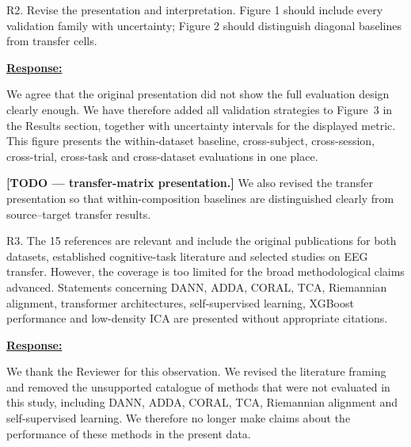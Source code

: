 \documentclass{article}
\begin{document}
\vspace{0.3cm}


\begin{cmt}{}{}

R2. Revise the presentation and interpretation. Figure 1 should include every
validation family with uncertainty; Figure 2 should distinguish diagonal
baselines from transfer cells.

\end{cmt}
\vspace{0.1cm}
\noindent
\underline{\textbf{Response:}}
\vspace{0.2cm}

We agree that the original presentation did not show the full evaluation
design clearly enough. We have therefore added all validation strategies to
Figure~3 in the Results section, together with uncertainty intervals for the
displayed metric. This figure presents the within-dataset baseline,
cross-subject, cross-session, cross-trial, cross-task and cross-dataset
evaluations in one place.

\textbf{[TODO --- transfer-matrix presentation.]}
We also revised the transfer presentation so that within-composition baselines
are distinguished clearly from source--target transfer results.

\vspace{0.3cm}


\begin{cmt}{}{}

R3. The 15 references are relevant and include the original publications for
both datasets, established cognitive-task literature and selected studies on EEG
transfer. However, the coverage is too limited for the broad methodological
claims advanced. Statements concerning DANN, ADDA, CORAL, TCA, Riemannian
alignment, transformer architectures, self-supervised learning, XGBoost
performance and low-density ICA are presented without appropriate citations.

\end{cmt}
\vspace{0.1cm}
\noindent
\underline{\textbf{Response:}}
\vspace{0.2cm}

We thank the Reviewer for this observation. We revised the literature framing
and removed the unsupported catalogue of methods that were not evaluated in
this study, including DANN, ADDA, CORAL, TCA, Riemannian alignment and
self-supervised learning. We therefore no longer make claims about the
performance of these methods in the present data.
\end{document}

